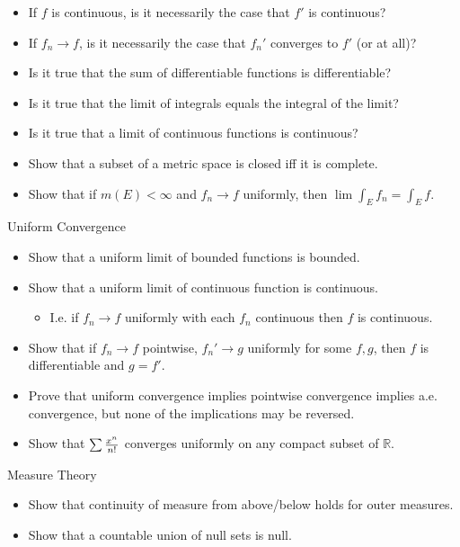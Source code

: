 \begin{itemize}
\tightlist
\item
  If \(f\) is continuous, is it necessarily the case that \(f'\) is
  continuous?
\item
  If \(f_n \to f\), is it necessarily the case that \(f_n'\) converges
  to \(f'\) (or at all)?
\item
  Is it true that the sum of differentiable functions is differentiable?
\item
  Is it true that the limit of integrals equals the integral of the
  limit?
\item
  Is it true that a limit of continuous functions is continuous?
\item
  Show that a subset of a metric space is closed iff it is complete.
\item
  Show that if \(m(E) < \infty\) and \(f_n\to f\) uniformly, then
  \(\lim \int_E f_n = \int_E f\).
\end{itemize}

Uniform Convergence

\begin{itemize}
\tightlist
\item
  Show that a uniform limit of bounded functions is bounded.
\item
  Show that a uniform limit of continuous function is continuous.

  \begin{itemize}
  \tightlist
  \item
    I.e. if \(f_n\to f\) uniformly with each \(f_n\) continuous then
    \(f\) is continuous.
  \end{itemize}
\item
  Show that if \(f_n\to f\) pointwise, \(f_n' \to g\) uniformly for some
  \(f, g\), then \(f\) is differentiable and \(g = f'\).
\item
  Prove that uniform convergence implies pointwise convergence implies
  a.e. convergence, but none of the implications may be reversed.
\item
  Show that \(\sum {x^n \over n!}\) converges uniformly on any compact
  subset of \({\mathbb{R}}\).
\end{itemize}

Measure Theory

\begin{itemize}
\item
  Show that continuity of measure from above/below holds for outer
  measures.
\item
  Show that a countable union of null sets is null.
\end{itemize}


